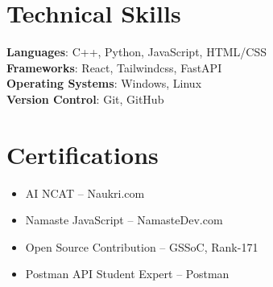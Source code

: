 \documentclass[letterpaper,11pt]{article}
\newcommand{\certItemListStart}{
  \begin{itemize}[leftmargin=*, label=\textbullet, itemsep=2pt, topsep=2pt, parsep=0pt, partopsep=0pt]
}
\newcommand{\certItemListEnd}{\end{itemize}\vspace{-5pt}}
\newcommand{\certItem}[1]{\item\small{#1}\vspace{-2pt}}
\begin{document}
%
\section{Technical Skills}
 \begin{itemize}[leftmargin=0.15in, label={}]
    \small{\item{
     \textbf{Languages}{: C++, Python, JavaScript, HTML/CSS} \\
     \textbf{Frameworks}{: React, Tailwindcss, FastAPI} \\
     \textbf{Operating Systems}{: Windows, Linux} \\
     \textbf{Version Control}{: Git, GitHub} \\
    }}
 \end{itemize}





\section{Certifications}
\certItemListStart
  \certItem{AI NCAT – Naukri.com}
  \certItem{Namaste JavaScript – NamasteDev.com}
  \certItem{Open Source Contribution – GSSoC, Rank-171}
  \certItem{Postman API Student Expert – Postman}
\certItemListEnd



\end{document}
